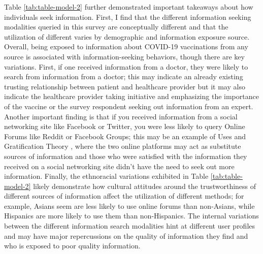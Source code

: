 Table \ref{tab:table-model-2} further demonstrated important takeaways about
how individuals seek information. First, I find that the different information
seeking modalities queried in this survey are conceptually different and that the
utilization of different varies by demographic and information exposure source. 
Overall, being exposed to information about COVID-19 vaccinations from any 
source is associated with information-seeking behaviors,
though there are key variations. First, if one received information from a
doctor, they were likely to search from information from a doctor; this may
indicate an already existing trusting relationship between patient and
healthcare provider but it may also indicate the healthcare provider taking
initiative and emphasizing the importance of the vaccine or the survey respondent
seeking out information from an expert. Another important finding is that if you
received information from a social networking site like Facebook or Twitter, you
were less likely to query Online Forums like Reddit or Facebook Groups; this may
be an example of Uses and Gratification Theory
\citep{blumlerUsesMassCommunications1974}, where the two online platforms may act as
substitute sources of information and those who were satisfied with the
information they received on a social networking site didn't have the need to
seek out more information. Finally, the ethnoracial variations exhibited in
Table \ref{tab:table-model-2} likely demonstrate how cultural attitudes around
the trustworthiness of different sources of information affect the utilization
of different methods; for example, Asians seem are less likely to use online
forums than non-Asians, while Hispanics are more likely to use them than
non-Hispanics. The internal variations between the different information search
modalities hint at different user profiles and may have major repercussions on the
quality of information they find and who is exposed to poor quality information.

